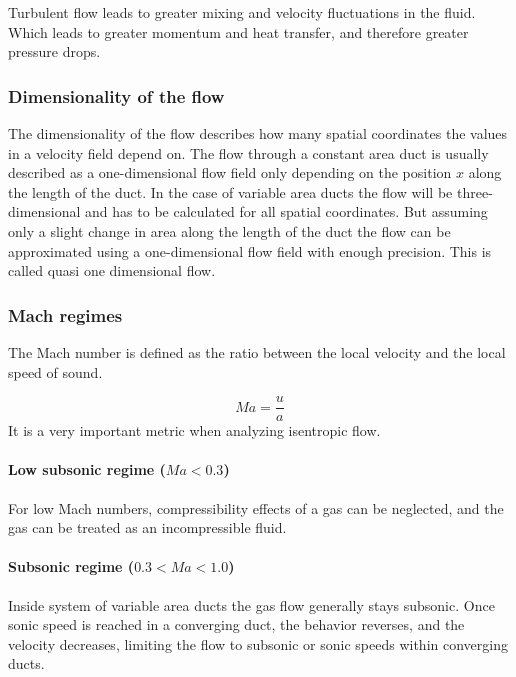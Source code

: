 	Turbulent flow leads to greater mixing and velocity fluctuations in the fluid.
	Which leads to greater momentum and heat transfer, and therefore greater pressure drops. 

\subsubsection{Dimensionality of the flow}

	The dimensionality of the flow describes how many spatial coordinates the values in a velocity field depend on.
	The flow through a constant area duct is usually described as a one-dimensional flow field only depending on the position $x$ along the length of the duct.
	In the case of variable area ducts the flow will be three-dimensional and has to be calculated for all spatial coordinates.
	But assuming only a slight change in area along the length of the duct the flow can be approximated using a one-dimensional flow field with enough precision.
	This is called quasi one dimensional flow.

\newpage

\subsubsection{Mach regimes}


	The Mach number is defined as the ratio between the local velocity and the local speed of sound.
	
	$$
		Ma = \frac{u}{a}
	$$
	It is a very important metric when analyzing isentropic flow.

\paragraph{Low subsonic regime (\(Ma < 0.3\))}

	For low Mach numbers, compressibility effects of a gas can be neglected, and the gas can be treated as an incompressible fluid.
\paragraph{Subsonic regime (\(0.3 < Ma < 1.0\))} 

	Inside system of variable area ducts the gas flow generally stays subsonic.
	Once sonic speed is reached in a converging duct, the behavior reverses, and the velocity decreases, limiting the flow to subsonic or sonic speeds within converging ducts.\\
	
